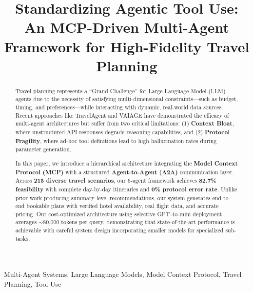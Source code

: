 \documentclass[conference]{IEEEtran}
\begin{document}
\title{Standardizing Agentic Tool Use: An MCP-Driven Multi-Agent Framework for High-Fidelity Travel Planning}

\author{
}

\maketitle

\begin{abstract}
Travel planning represents a ``Grand Challenge'' for Large Language Model (LLM) agents due to the necessity of satisfying multi-dimensional constraints---such as budget, timing, and preferences---while interacting with dynamic, real-world data sources. Recent approaches like TravelAgent and VAIAGE have demonstrated the efficacy of multi-agent architectures but suffer from two critical limitations: (1) \textbf{Context Bloat}, where unstructured API responses degrade reasoning capabilities, and (2) \textbf{Protocol Fragility}, where ad-hoc tool definitions lead to high hallucination rates during parameter generation.

In this paper, we introduce a hierarchical architecture integrating the \textbf{Model Context Protocol (MCP)} with a structured \textbf{Agent-to-Agent (A2A)} communication layer. Across \textbf{215 diverse travel scenarios}, our 6-agent framework achieves \textbf{82.7\% feasibility} with complete day-by-day itineraries and \textbf{0\% protocol error rate}. Unlike prior work producing summary-level recommendations, our system generates end-to-end bookable plans with verified hotel availability, real flight data, and accurate pricing. Our cost-optimized architecture using selective GPT-4o-mini deployment averages $\sim$80,000 tokens per query, demonstrating that state-of-the-art performance is achievable with careful system design incorporating smaller models for specialized sub-tasks.
\end{abstract}

\begin{IEEEkeywords}
Multi-Agent Systems, Large Language Models, Model Context Protocol, Travel Planning, Tool Use
\end{IEEEkeywords}

\end{document}
